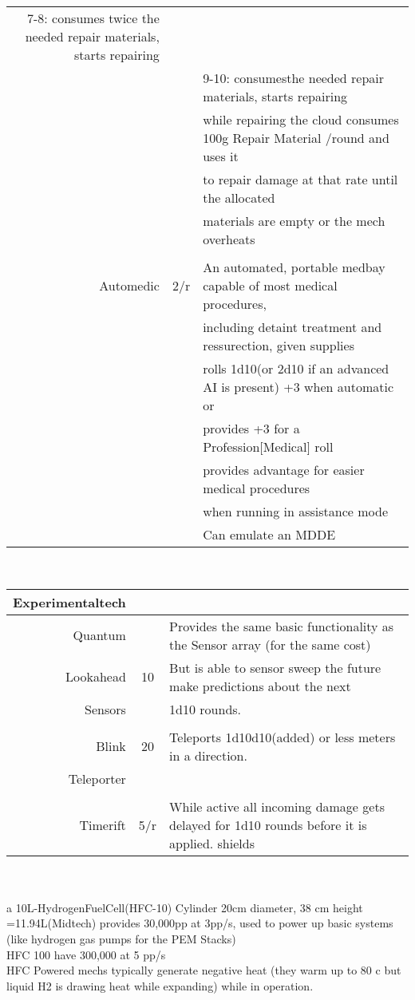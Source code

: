 \documentclass{article}
\begin{document}
\begin{tabular}{rcl}
                    7-8: consumes twice the needed repair materials, starts repairing \\&&
                    9-10: consumesthe needed repair materials, starts repairing\\&&
                    while repairing the cloud consumes 100g Repair Material /round and uses it \\&&
                    to repair damage at that rate until the allocated \\&& materials are empty or the mech overheats\\\\
Automedic & 2/r & An automated, portable medbay capable of most medical procedures,\\&&
                    including detaint treatment and ressurection, given supplies\\&&
                    rolls 1d10(or 2d10 if an advanced AI is present) +3 when automatic or
                    \\&&provides +3 for a Profession[Medical] roll \\&&
                    provides advantage for easier medical procedures \\&& when running in assistance mode\\&&
                    Can emulate an MDDE\\
\end{tabular}\\\begin{tabular}{rcl}\\Experimentaltech\\\hline
Quantum &       &Provides the same basic functionality as the Sensor array (for the same cost)\\
Lookahead& 10 & But is able to sensor sweep the future make predictions about the next \\
Sensors&    &1d10 rounds.\\\\
Blink  &  20    & Teleports 1d10d10(added) or less meters in a direction.\\
Teleporter\\\\
Timerift & 5/r & While active all incoming damage gets delayed for 1d10 rounds before it is applied.
shields

\end{tabular}\\\\




a 10L-HydrogenFuelCell(HFC-10) Cylinder 20cm diameter, 38 cm height =11.94L(Midtech) provides 30,000pp at 3pp/s, used to power up basic systems (like hydrogen gas pumps for the PEM Stacks)\\
HFC 100 have 300,000 at 5 pp/s\\
HFC Powered mechs typically generate negative heat (they warm up to 80 c but liquid H2 is drawing heat while expanding) while in operation.\\
\end{document}
